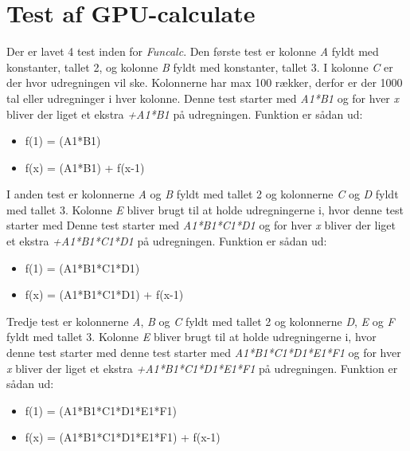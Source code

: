 \section{Test af GPU-calculate}
\label{TEST_GPU}
Der er lavet 4 test inden for \textit{Funcalc}. Den første test er kolonne \textit{A} fyldt med konstanter, tallet 2, og kolonne \textit{B} fyldt med konstanter, tallet 3. I kolonne \textit{C} er der hvor udregningen vil ske. Kolonnerne har max 100 rækker, derfor er der 1000 tal eller udregninger i hver kolonne. Denne test starter med \textit{A1*B1} og for hver \textit{x} bliver der liget et ekstra \textit{+A1*B1} på udregningen. Funktion er sådan ud:
\begin{itemize}
\item f(1) = (A1*B1)
\item f(x) = (A1*B1) + f(x-1)
\end{itemize}

I anden test er kolonnerne \textit{A} og \textit{B} fyldt med tallet 2 og kolonnerne \textit{C} og \textit{D} fyldt med tallet 3. Kolonne \textit{E} bliver brugt til at holde udregningerne i, hvor denne test starter med Denne test starter med \textit{A1*B1*C1*D1} og for hver \textit{x} bliver der liget et ekstra \textit{+A1*B1*C1*D1} på udregningen. Funktion er sådan ud:
\begin{itemize}
\item f(1) = (A1*B1*C1*D1)
\item f(x) = (A1*B1*C1*D1) + f(x-1)
\end{itemize}

Tredje test er kolonnerne \textit{A}, \textit{B} og \textit{C} fyldt med tallet 2 og kolonnerne \textit{D}, \textit{E} og \textit{F} fyldt med tallet 3. Kolonne \textit{E} bliver brugt til at holde udregningerne i, hvor denne test starter med denne test starter med \textit{A1*B1*C1*D1*E1*F1} og for hver \textit{x} bliver der liget et ekstra \textit{+A1*B1*C1*D1*E1*F1} på udregningen. Funktion er sådan ud:
\begin{itemize}
\item f(1) = (A1*B1*C1*D1*E1*F1)
\item f(x) = (A1*B1*C1*D1*E1*F1) + f(x-1)
\end{itemize}

